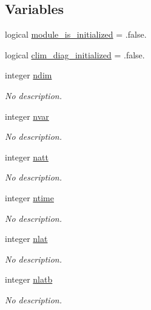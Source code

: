 \subsection*{Variables}
\begin{DoxyCompactItemize}
\item 
logical \hyperlink{namespaceinterpolator__mod_ae7d4ce9b2f2c2bad62b1b5ccc42c47d4}{module\+\_\+is\+\_\+initialized} = .false.
\item 
logical \hyperlink{namespaceinterpolator__mod_a7c2831b23ac995cf169be6a48e68d922}{clim\+\_\+diag\+\_\+initialized} = .false.
\item 
integer \hyperlink{namespaceinterpolator__mod_afe7363e978db4f43d2ec875782d11905}{ndim}
\begin{DoxyCompactList}\small\item\em No description. \end{DoxyCompactList}\item 
integer \hyperlink{namespaceinterpolator__mod_a8b6676021f1433389722a1e58874ef24}{nvar}
\begin{DoxyCompactList}\small\item\em No description. \end{DoxyCompactList}\item 
integer \hyperlink{namespaceinterpolator__mod_aacd4aa63767bc26edefcb04c29f8028a}{natt}
\begin{DoxyCompactList}\small\item\em No description. \end{DoxyCompactList}\item 
integer \hyperlink{namespaceinterpolator__mod_a198173eacff0dac724ca6685559cc5d0}{ntime}
\begin{DoxyCompactList}\small\item\em No description. \end{DoxyCompactList}\item 
integer \hyperlink{namespaceinterpolator__mod_abcdb088fcb76bc41c4e1f580647333ba}{nlat}
\begin{DoxyCompactList}\small\item\em No description. \end{DoxyCompactList}\item 
integer \hyperlink{namespaceinterpolator__mod_ac9300e7ba21e0be5f73bc6e3b8b8b088}{nlatb}
\begin{DoxyCompactList}\small\item\em No description. \end{DoxyCompactList}\item 

\end{DoxyCompactItemize}
